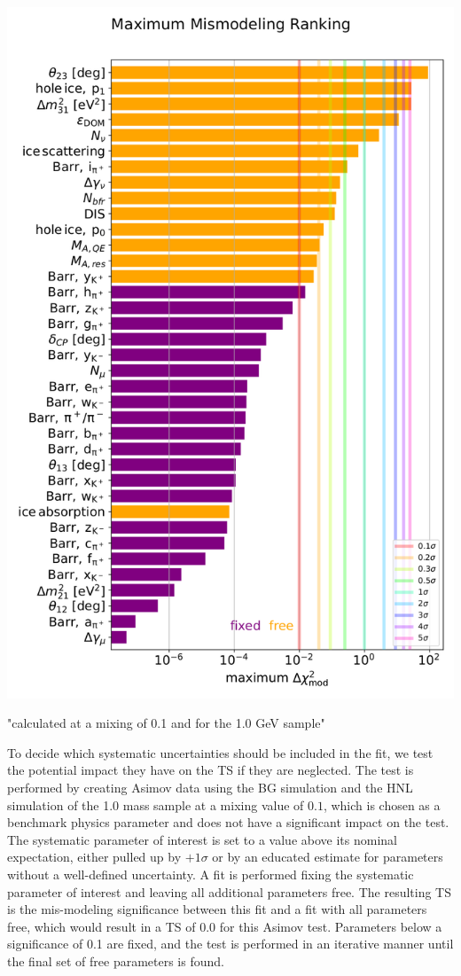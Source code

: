 \begin{marginfigure}
    \includegraphics{figures/results/checks/plot_systematic_impact_ranking.png}
	\caption[xx]{"calculated at a mixing of 0.1 and for the 1.0 GeV sample"}
\end{marginfigure}

To decide which systematic uncertainties should be included in the fit, we test the potential impact they have on the TS if they are neglected. The test is performed by creating Asimov data using the BG simulation and the HNL simulation of the \SI{1.0}{\gev} mass sample at a mixing value of $0.1$, which is chosen as a benchmark physics parameter and does not have a significant impact on the test. The systematic parameter of interest is set to a value above its nominal expectation, either pulled up by $+1\sigma$ or by an educated estimate for parameters without a well-defined uncertainty. A fit is performed fixing the systematic parameter of interest and leaving all additional parameters free. The resulting TS is the mis-modeling significance between this fit and a fit with all parameters free, which would result in a TS of 0.0 for this Asimov test. Parameters below a significance of \SI{0.1}{\sigma} are fixed, and the test is performed in an iterative manner until the final set of free parameters is found.

